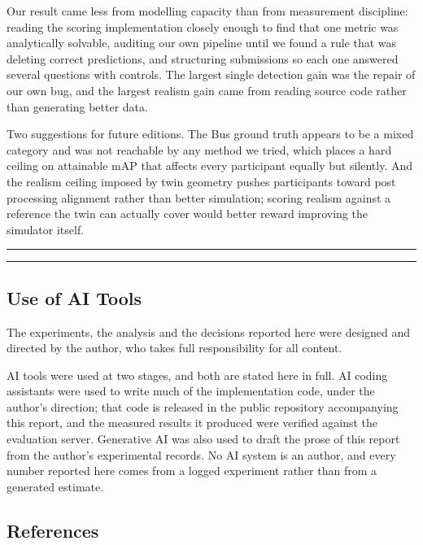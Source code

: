 \documentclass[
  10pt,
]{article}
\begin{document}
Our result came less from modelling capacity than from measurement
discipline: reading the scoring implementation closely enough to find
that one metric was analytically solvable, auditing our own pipeline
until we found a rule that was deleting correct predictions, and
structuring submissions so each one answered several questions with
controls. The largest single detection gain was the repair of our own
bug, and the largest realism gain came from reading source code rather
than generating better data.

Two suggestions for future editions. The Bus ground truth appears to be
a mixed category and was not reachable by any method we tried, which
places a hard ceiling on attainable mAP that affects every participant
equally but silently. And the realism ceiling imposed by twin geometry
pushes participants toward post processing alignment rather than better
simulation; scoring realism against a reference the twin can actually
cover would better reward improving the simulator itself.

\begin{center}\rule{0.5\linewidth}{0.5pt}\end{center}

\begin{center}\rule{0.5\linewidth}{0.5pt}\end{center}

\subsection{Use of AI Tools}\label{use-of-ai-tools}

The experiments, the analysis and the decisions reported here were designed and
directed by the author, who takes full responsibility for all content.

AI tools were used at two stages, and both are stated here in full. AI coding
assistants were used to write much of the implementation code, under the author's
direction; that code is released in the public repository accompanying this report,
and the measured results it produced were verified against the evaluation server.
Generative AI was also used to draft the prose of this report from the author's
experimental records. No AI system is an author, and every number reported here
comes from a logged experiment rather than from a generated estimate.

\subsection{References}\label{references}
\end{document}
